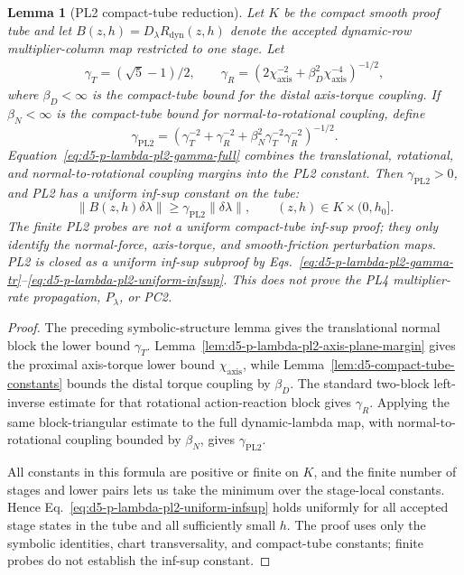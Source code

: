 \documentclass[preprint,12pt]{elsarticle}
\newtheorem{lemma}{Lemma}
\begin{document}
\begin{lemma}[PL2 compact-tube reduction]
\label{lem:d5-p-lambda-pl2-compact-reduction}
Let \(K\) be the compact smooth proof tube and let
\(B(z,h)=D_{\lambda}R_{\mathrm{dyn}}(z,h)\) denote the accepted
dynamic-row multiplier-column map restricted to one stage.  Let
\begin{equation}
\label{eq:d5-p-lambda-pl2-gamma-tr}
\begin{aligned}
  \gamma_T={(\sqrt5-1)}/{2},\qquad
  \gamma_R=\left(2\chi_{\mathrm{axis}}^{-2}
     +\beta_D^2\chi_{\mathrm{axis}}^{-4}\right)^{-1/2},
\end{aligned}
\end{equation}
where \(\beta_D<\infty\) is the compact-tube bound for the distal
axis-torque coupling.  If \(\beta_N<\infty\) is the compact-tube bound for
normal-to-rotational coupling, define
\begin{equation}
\label{eq:d5-p-lambda-pl2-gamma-full}
  \gamma_{\mathrm{PL2}}
  =\left(\gamma_T^{-2}+\gamma_R^{-2}
     +\beta_N^2\gamma_T^{-2}\gamma_R^{-2}\right)^{-1/2}.
\end{equation}
Equation~\eqref{eq:d5-p-lambda-pl2-gamma-full} combines the translational,
rotational, and normal-to-rotational coupling margins into the PL2 constant.
Then \(\gamma_{\mathrm{PL2}}>0\), and PL2 has a uniform inf-sup constant on
the tube:
\begin{equation}
\label{eq:d5-p-lambda-pl2-uniform-infsup}
  \|B(z,h)\delta\lambda\|
  \ge \gamma_{\mathrm{PL2}}\|\delta\lambda\|,
  \qquad (z,h)\in K\times(0,h_0].
\end{equation}
The finite PL2 probes are not a uniform compact-tube inf-sup proof; they only identify the
normal-force, axis-torque, and smooth-friction perturbation maps.  PL2 is
closed as a uniform inf-sup subproof by
Eqs.~\eqref{eq:d5-p-lambda-pl2-gamma-tr}--\eqref{eq:d5-p-lambda-pl2-uniform-infsup}.
This does
not prove the PL4 multiplier-rate propagation, \(P_{\lambda}\), or PC2.
\end{lemma}

\begin{proof}
The preceding symbolic-structure lemma gives the translational normal block
the lower bound \(\gamma_T\).  Lemma~\ref{lem:d5-p-lambda-pl2-axis-plane-margin}
gives the proximal axis-torque lower bound \(\chi_{\mathrm{axis}}\), while
Lemma~\ref{lem:d5-compact-tube-constants} bounds the distal torque coupling
by \(\beta_D\).  The standard two-block left-inverse estimate for that
rotational action-reaction block gives \(\gamma_R\).  Applying the same
block-triangular estimate to the full dynamic-lambda map, with
normal-to-rotational coupling bounded by \(\beta_N\), gives
\(\gamma_{\mathrm{PL2}}\).

All constants in this formula are positive or finite on \(K\), and the finite
number of stages and lower pairs lets us take the minimum over the stage-local
constants.  Hence Eq.~\eqref{eq:d5-p-lambda-pl2-uniform-infsup} holds uniformly for all accepted
stage states in the tube and all sufficiently small \(h\).  The proof uses
only the symbolic identities, chart transversality, and compact-tube
constants; finite probes do not establish the inf-sup constant.
\end{proof}
\end{document}

